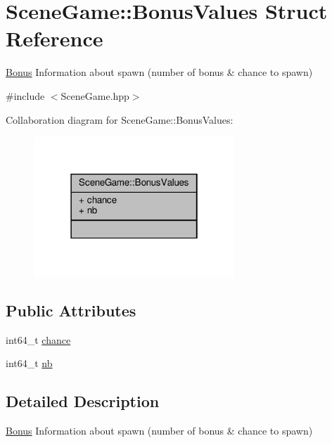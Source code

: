 \hypertarget{struct_scene_game_1_1_bonus_values}{}\section{Scene\+Game\+:\+:Bonus\+Values Struct Reference}
\label{struct_scene_game_1_1_bonus_values}


\hyperlink{class_bonus}{Bonus} Information about spawn (number of bonus \& chance to spawn)  




{\ttfamily \#include $<$Scene\+Game.\+hpp$>$}



Collaboration diagram for Scene\+Game\+:\+:Bonus\+Values\+:
\nopagebreak
\begin{figure}[H]
\begin{center}
\leavevmode
\includegraphics[width=214pt]{struct_scene_game_1_1_bonus_values__coll__graph}
\end{center}
\end{figure}
\subsection*{Public Attributes}
\begin{DoxyCompactItemize}
\item 
int64\+\_\+t \hyperlink{struct_scene_game_1_1_bonus_values_affe45b7f7a76f77c2897f3341839abfe}{chance}
\item 
int64\+\_\+t \hyperlink{struct_scene_game_1_1_bonus_values_a826313028a99bb7df6fef3587628c16c}{nb}
\end{DoxyCompactItemize}


\subsection{Detailed Description}
\hyperlink{class_bonus}{Bonus} Information about spawn (number of bonus \& chance to spawn) 

